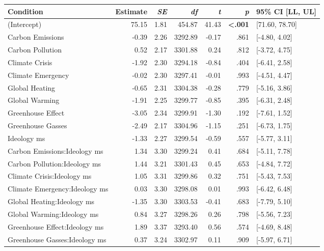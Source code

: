 \begin{table}[ht]
\centering
\begin{tabular}{lrrrrrl}
  \hline
Condition & Estimate & \textit{SE} & \textit{df} & \textit{t} & \textit{p} & 95\% CI [LL, UL] \\ 
  \hline
(Intercept) & 75.15 & 1.81 & 454.87 & 41.43 & \textbf{\textless  .001} & [71.60, 78.70] \\ 
  Carbon Emissions & -0.39 & 2.26 & 3292.89 & -0.17 & .861 & [-4.80, 4.02] \\ 
  Carbon Pollution & 0.52 & 2.17 & 3301.88 & 0.24 & .812 & [-3.72, 4.75] \\ 
  Climate Crisis & -1.92 & 2.30 & 3294.18 & -0.84 & .404 & [-6.41, 2.58] \\ 
  Climate Emergency & -0.02 & 2.30 & 3297.41 & -0.01 & .993 & [-4.51, 4.47] \\ 
  Global Heating & -0.65 & 2.31 & 3304.38 & -0.28 & .779 & [-5.16, 3.86] \\ 
  Global Warming & -1.91 & 2.25 & 3299.77 & -0.85 & .395 & [-6.31, 2.48] \\ 
  Greenhouse Effect & -3.05 & 2.34 & 3299.91 & -1.30 & .192 & [-7.61, 1.52] \\ 
  Greenhouse Gasses & -2.49 & 2.17 & 3304.96 & -1.15 & .251 & [-6.73, 1.75] \\ 
  Ideology ms & -1.33 & 2.27 & 3299.54 & -0.59 & .557 & [-5.77, 3.11] \\ 
  Carbon Emissions:Ideology ms & 1.34 & 3.30 & 3299.24 & 0.41 & .684 & [-5.11, 7.78] \\ 
  Carbon Pollution:Ideology ms & 1.44 & 3.21 & 3301.43 & 0.45 & .653 & [-4.84, 7.72] \\ 
  Climate Crisis:Ideology ms & 1.05 & 3.31 & 3299.86 & 0.32 & .751 & [-5.43, 7.53] \\ 
  Climate Emergency:Ideology ms & 0.03 & 3.30 & 3298.08 & 0.01 & .993 & [-6.42, 6.48] \\ 
  Global Heating:Ideology ms & -1.35 & 3.30 & 3303.53 & -0.41 & .683 & [-7.79, 5.10] \\ 
  Global Warming:Ideology ms & 0.84 & 3.27 & 3298.26 & 0.26 & .798 & [-5.56, 7.23] \\ 
  Greenhouse Effect:Ideology ms & 1.89 & 3.37 & 3293.40 & 0.56 & .574 & [-4.69, 8.48] \\ 
  Greenhouse Gasses:Ideology ms & 0.37 & 3.24 & 3302.97 & 0.11 & .909 & [-5.97, 6.71] \\ 
   \hline
\end{tabular}
\end{table}
